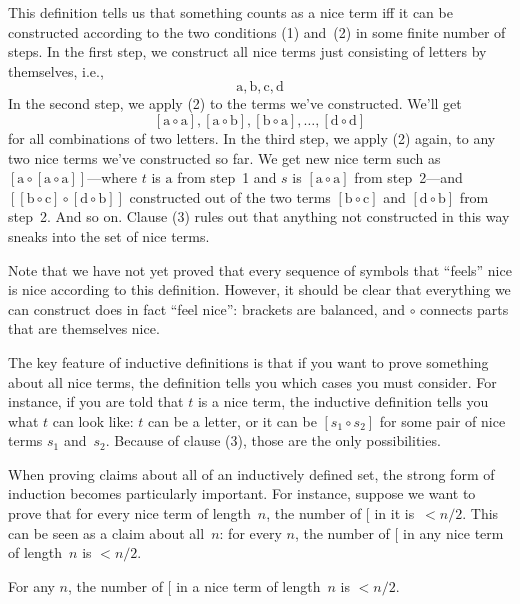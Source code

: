 \documentclass[../../../include/open-logic-section]{subfiles}
\begin{document}
This definition tells us that something counts as a nice term iff it
can be constructed according to the two conditions (1) and~(2) in some
finite number of steps. In the first step, we construct all nice terms
just consisting of letters by themselves, i.e.,
\[
\mathrm{a}, \mathrm{b}, \mathrm{c}, \mathrm{d}
\]
In the second step, we apply (2) to the terms we've constructed. We'll get
\[
[\mathrm{a} \circ \mathrm{a}], [\mathrm{a} \circ \mathrm{b}],
[\mathrm{b} \circ \mathrm{a}], \dots, [\mathrm{d} \circ \mathrm{d}]
\]
for all combinations of two letters. In the third step, we apply (2)
again, to any two nice terms we've constructed so far. We get new nice
term such as $[\mathrm{a} \circ [\mathrm{a} \circ
    \mathrm{a}]]$---where $t$ is $\mathrm{a}$ from step~1 and $s$ is
$[\mathrm{a} \circ \mathrm{a}]$ from step~2---and $[[\mathrm{b} \circ
    \mathrm{c}] \circ [\mathrm{d} \circ \mathrm{b}]]$ constructed out
of the two terms $[\mathrm{b} \circ \mathrm{c}]$ and $[\mathrm{d}
  \circ \mathrm{b}]$ from step~2. And so on.  Clause (3) rules out
that anything not constructed in this way sneaks into the set of nice
terms.

Note that we have not yet proved that every sequence of symbols that
``feels'' nice is nice according to this definition. However, it
should be clear that everything we can construct does in fact ``feel
nice'': brackets are balanced, and $\circ$ connects parts that are
themselves nice.

The key feature of inductive definitions is that if you want to prove
something about all nice terms, the definition tells you which cases
you must consider.  For instance, if you are told that $t$ is a nice
term, the inductive definition tells you what $t$ can look like: $t$
can be a letter, or it can be $[s_1 \circ s_2]$ for some pair of
nice terms $s_1$ and~$s_2$. Because of clause (3), those are the only
possibilities.

When proving claims about all of an inductively defined set, the
strong form of induction becomes particularly important. For instance,
suppose we want to prove that for every nice term of length~$n$, the
number of $[$ in it is~$< n/2$.  This can be seen as a claim about
all~$n$: for every $n$, the number of $[$ in any nice term of
length~$n$ is $< n/2$.

\begin{prop}
  For any $n$, the number of $[$ in a nice term of length~$n$ is
  $< n/2$.
\end{prop}
\end{document}

